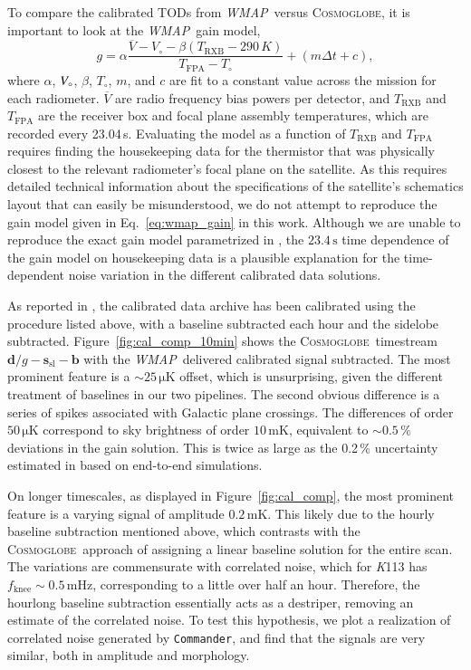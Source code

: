 \documentclass[twocolumn]{../../common/aa}
\def\WMAP{\emph{WMAP}}
\def\commander{\texttt{Commander}}
\newcommand{\cosmoglobe}{\textsc{Cosmoglobe}}
\newcommand{\K}[0]{\textit K}
\newcommand{\V}[0]{\textit V}
\begin{document}
To compare the calibrated TODs from \WMAP\ versus \cosmoglobe, it is  important to look at the \WMAP\ gain model,
\begin{equation}
	\label{eq:wmap_gain}
	g=\alpha\frac{\overline V-V_\circ-\beta(T_\mathrm{RXB}-290\,K)}
	{T_\mathrm{FPA}-T_\circ}+(m\Delta t+c),
\end{equation}
where $\alpha$, $\V_\circ$, $\beta$, $T_\circ$, $m$, and $c$ are fit to a constant value across the mission for each radiometer. $\overline V$ are radio frequency bias powers per detector, and $T_\mathrm{RXB}$ and $T_\mathrm{FPA}$ are the receiver box and focal plane assembly temperatures, which are recorded every 23.04\,s. 
Evaluating the model as a function of $T_\mathrm{RXB}$ and $T_\mathrm{FPA}$ requires finding the housekeeping data for the thermistor that was physically closest to the relevant radiometer's focal plane on the satellite. As this requires detailed technical information about the specifications of the satellite's schematics layout that can easily be misunderstood, we do not attempt to reproduce the gain model given in Eq.~\eqref{eq:wmap_gain} in this work.
Although we are unable to reproduce the exact gain model parametrized in \citet{wmapexsupp}, the $23.4\,\mathrm s$ time dependence of the gain model on housekeeping data is a plausible explanation for the time-dependent noise variation in the different calibrated data solutions.

As reported in \citet{hinshaw2007}, the calibrated data archive has been calibrated using the procedure listed above, with a baseline subtracted each hour and the sidelobe subtracted. Figure~\ref{fig:cal_comp_10min} shows the \cosmoglobe\ timestream $\boldsymbol d/g-\boldsymbol s_\mathrm{sl}-\boldsymbol b$ with the \WMAP\ delivered calibrated signal subtracted. The most prominent feature is a $\sim25\,\mathrm{\mu K}$ offset, which is unsurprising, given the different treatment of baselines in our two pipelines. The second obvious difference is a series of spikes associated with Galactic plane crossings. The differences of order $50\,\mathrm{\mu K}$ correspond to sky brightness of order $10\,\mathrm{mK}$, equivalent to $\sim0.5\,\%$ deviations in the gain solution. This is twice as large as the 0.2\,\% uncertainty estimated in \citet{bennett2012} based on end-to-end simulations.

On longer timescales, as displayed in Figure~\ref{fig:cal_comp}, the most prominent feature is a varying signal of amplitude $0.2\,\mathrm{mK}$. This likely due to the hourly baseline subtraction mentioned above, which contrasts with the \cosmoglobe\ approach of assigning a linear baseline solution for the entire scan. The variations are commensurate with correlated noise, which for \K113 has ${f_\mathrm{knee}\sim0.5\,\mathrm{mHz}}$, corresponding to a little over half an hour. Therefore, the hourlong baseline subtraction essentially acts as a destriper, removing an estimate of the correlated noise. To test this hypothesis, we plot a realization of correlated noise generated by \commander, and find that the signals are very similar, both in amplitude and morphology.
\end{document}
